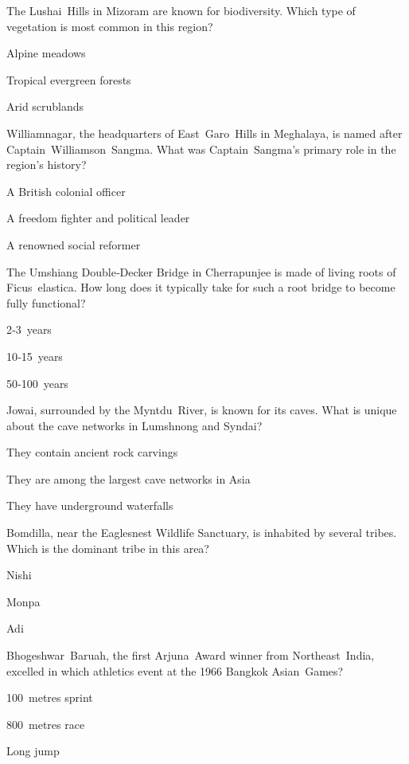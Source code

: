 \begin{enhancedmcq}{The Lushai Hills in Mizoram are known for biodiversity. Which type of vegetation is most common in this region?}
\item Alpine meadows
\item Tropical evergreen forests
\item Arid scrublands

\end{enhancedmcq}
\begin{enhancedmcq}{Williamnagar, the headquarters of East Garo Hills in Meghalaya, is named after Captain Williamson Sangma. What was Captain Sangma's primary role in the region's history?}
\item A British colonial officer
\item A freedom fighter and political leader
\item A renowned social reformer

\end{enhancedmcq}
\begin{enhancedmcq}{The Umshiang Double‑Decker Bridge in Cherrapunjee is made of living roots of Ficus elastica. How long does it typically take for such a root bridge to become fully functional?}
\item 2‑3 years
\item 10‑15 years
\item 50‑100 years

\end{enhancedmcq}
\begin{enhancedmcq}{Jowai, surrounded by the Myntdu River, is known for its caves. What is unique about the cave networks in Lumshnong and Syndai?}
\item They contain ancient rock carvings
\item They are among the largest cave networks in Asia
\item They have underground waterfalls

\end{enhancedmcq}
\begin{enhancedmcq}{Bomdilla, near the Eaglesnest Wildlife Sanctuary, is inhabited by several tribes. Which is the dominant tribe in this area?}
\item Nishi
\item Monpa
\item Adi

\end{enhancedmcq}
\begin{enhancedmcq}{Bhogeshwar Baruah, the first Arjuna Award winner from Northeast India, excelled in which athletics event at the 1966 Bangkok Asian Games?}
\item 100 metres sprint
\item 800 metres race
\item Long jump

\end{enhancedmcq}
